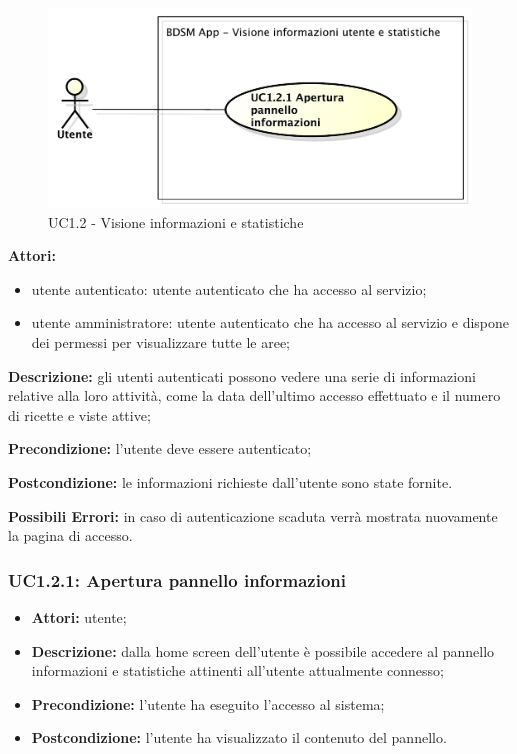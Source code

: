 \begin{figure}[htbp]
    \centering
    \centerline{\includegraphics[scale=0.6]{./images/UC1_2.pdf}}
    \caption{UC1.2 - Visione informazioni e statistiche}
\end{figure}
\textbf{Attori:}
  \begin{itemize}
    	\item utente autenticato: utente autenticato che ha accesso al servizio;
    	\item utente amministratore: utente autenticato che ha accesso al servizio e dispone dei permessi per visualizzare tutte le aree;
	\end{itemize}
	\textbf{Descrizione:} gli utenti autenticati possono vedere una serie di informazioni relative alla 	loro attività, come la data dell'ultimo accesso effettuato e il numero di ricette e viste attive;

	\textbf{Precondizione:} l'utente deve essere autenticato;
	
	\textbf{Postcondizione:} le informazioni richieste dall'utente sono state fornite.

	\textbf{Possibili Errori:} in caso di autenticazione scaduta verrà mostrata nuovamente la pagina di accesso.

\subsubsection{UC1.2.1: Apertura pannello informazioni}

\begin{itemize}
    \item \textbf{Attori:} utente;
    \item \textbf{Descrizione:} dalla home screen dell'utente è possibile accedere al pannello informazioni e statistiche attinenti all'utente attualmente connesso;
    \item \textbf{Precondizione:} l'utente ha eseguito l'accesso al sistema;
    \item \textbf{Postcondizione:} l'utente ha visualizzato il contenuto del pannello.
\end{itemize}

